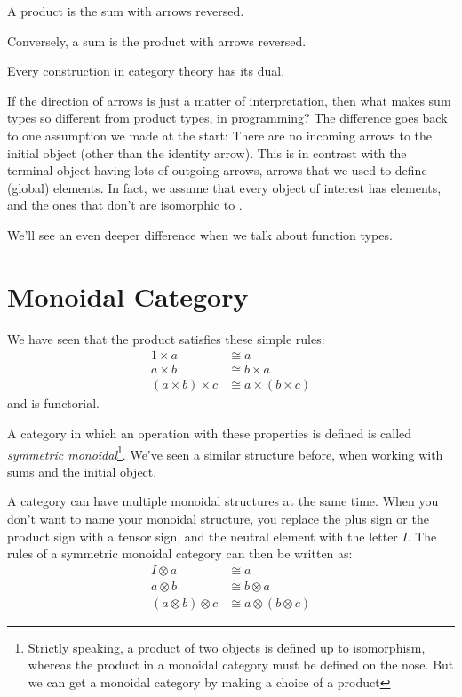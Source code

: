 \documentclass[DaoFP]{subfiles}
\begin{document}
A product is the sum with arrows reversed. 

Conversely, a sum is the product with arrows reversed. 

\medskip

Every construction in category theory has its dual.

\medskip

If the direction of arrows is just a matter of interpretation, then what makes sum types so different from product types, in programming? The difference goes back to one assumption we made at the start: There are no incoming arrows to the initial object (other than the identity arrow). This is in contrast with the terminal object having lots of outgoing arrows, arrows that we used to define (global) elements. In fact, we assume that every object of interest has elements, and the ones that don't are isomorphic to . 

We'll see an even deeper difference when we talk about function types.

\section{Monoidal Category}

We have seen that the product satisfies these simple rules:
\begin{align*}
1 \times a &\cong a
\\
a \times b &\cong b \times a
\\
(a \times b) \times c &\cong a \times (b \times c)
\end{align*}
and is functorial. 

A category in which an operation with these properties is defined is called \emph{symmetric monoidal}\footnote{Strictly speaking, a product of two objects is defined up to isomorphism, whereas the product in a monoidal category must be defined on the nose. But we can get a monoidal category by making a choice of a product}. We've seen a similar structure before, when working with sums and the initial object. 

A category can have multiple monoidal structures at the same time. When you don't want to name your monoidal structure, you replace the plus sign or the product sign with a tensor sign, and the neutral element with the letter $I$. The rules of a symmetric monoidal category can then be written as:
\begin{align*}
I \otimes a &\cong a
\\
a \otimes b &\cong b \otimes a
\\
(a \otimes b) \otimes c &\cong a \otimes (b \otimes c)
\end{align*}
\end{document}
